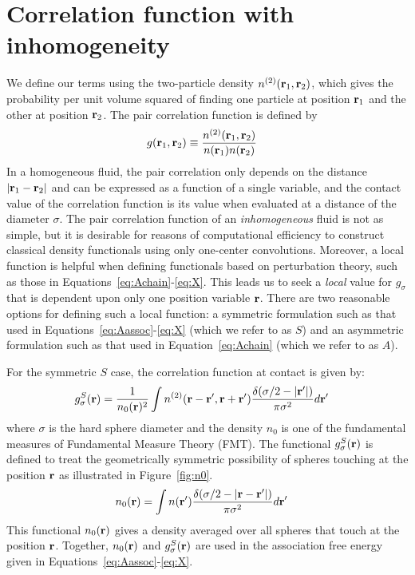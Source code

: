 \section{Correlation function with inhomogeneity}

We define our terms using the two-particle density
$n^{(2)}(\textbf{r}_1,\textbf{r}_2)$, which gives the probability per unit volume
squared of finding one particle at position $\textbf{r}_1$ and the other at
position $\textbf{r}_2$.  The pair correlation function is defined by
\begin{align}
  g(\textbf{r}_1,\textbf{r}_2) &\equiv \frac{n^{(2)}(\textbf{r}_1,\textbf{r}_2)}{n(\textbf{r}_1)n(\textbf{r}_2)}
\end{align}
In a homogeneous fluid, the pair correlation only depends on the
distance $|\textbf{r}_1-\textbf{r}_2|$ and can be expressed as a function of a
single variable, and the contact value of the correlation function is
its value when evaluated at a distance of the diameter $\sigma$.  The
pair correlation function of an \emph{inhomogeneous} fluid is not as
simple, but it is desirable for reasons of computational efficiency to
construct classical density functionals using only one-center
convolutions.  Moreover, a local function is helpful when defining
functionals based on perturbation theory, such as those in
Equations~\ref{eq:Achain}-\ref{eq:X}.  This leads
us to seek a \emph{local} value for $g_\sigma$ that is dependent upon
only one position variable $\textbf{r}$.  There are two reasonable options
for defining such a local function: a symmetric formulation such as
that used in Equations~\ref{eq:Aassoc}-\ref{eq:X} (which we refer to
as $S$) and an asymmetric formulation such as that used in
Equation~\ref{eq:Achain} (which we refer to as $A$).

For the symmetric $S$ case, the correlation function at contact is
given by:
\begin{align}
  g^S_\sigma(\textbf{r}) &= \frac{1}{n_0(\textbf{r})^2}\int n^{(2)}(\textbf{r} - \textbf{r}', \textbf{r}
  + \textbf{r}')
  \frac{\delta(\sigma/2 -|\textbf{r}'|)}{\pi\sigma^2}d\textbf{r}' \label{eq:gS}
\end{align}
where $\sigma$ is the hard sphere diameter and the density $n_0$ is one of
the fundamental measures of Fundamental Measure Theory (FMT).  The
functional $g^S_\sigma(\textbf{r})$ is defined to treat the geometrically
symmetric possibility of spheres touching at the position $\textbf{r}$ as
illustrated in Figure~\ref{fig:n0}.
\begin{align}
  n_0(\textbf{r}) &= \int n(\textbf{r}')\frac{\delta(\sigma/2 -|\textbf{r}-\textbf{r}'|)}{\pi\sigma^2} d\textbf{r}'
  \label{eq:n0}
\end{align}
This functional $n_0(\textbf{r})$ gives a density averaged over all spheres that touch at
the position $\textbf{r}$.  Together, $n_0(\textbf{r})$ and $g_\sigma^S(\textbf{r})$ are
used in the association free energy given in Equations~\ref{eq:Aassoc}-\ref{eq:X}.

